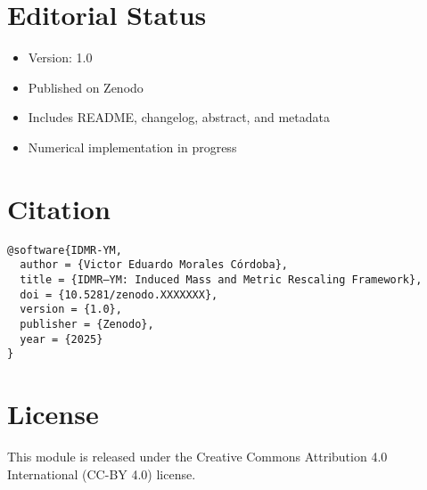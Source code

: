 \documentclass[12pt]{article}
\begin{document}
\section*{Editorial Status}
\begin{itemize}
  \item Version: 1.0
  \item Published on Zenodo
  \item Includes README, changelog, abstract, and metadata
  \item Numerical implementation in progress
\end{itemize}

\section*{Citation}
\begin{verbatim}
@software{IDMR-YM,
  author = {Victor Eduardo Morales Córdoba},
  title = {IDMR–YM: Induced Mass and Metric Rescaling Framework},
  doi = {10.5281/zenodo.XXXXXXX},
  version = {1.0},
  publisher = {Zenodo},
  year = {2025}
}
\end{verbatim}

\section*{License}
This module is released under the Creative Commons Attribution 4.0 International (CC-BY 4.0) license.
\end{document}
